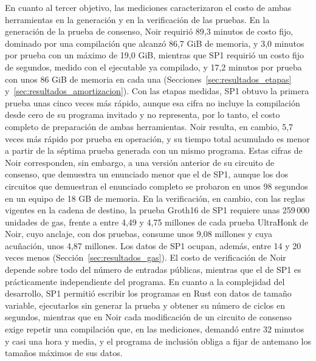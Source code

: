 En cuanto al tercer objetivo, las mediciones caracterizaron el costo de ambas herramientas
en la generación y en la verificación de las pruebas. En la generación de la prueba de consenso,
Noir requirió 89,3 minutos de costo fijo, dominado por una compilación que alcanzó 86,7 GiB de
memoria, y 3,0 minutos por prueba con un máximo de 19,0 GiB, mientras que SP1 requirió un costo
fijo de segundos, medido con el ejecutable ya compilado, y 17,2 minutos por prueba con unos 86 GiB de memoria en cada una
(Secciones~\ref{sec:resultados_etapas} y~\ref{sec:resultados_amortizacion}). Con las etapas
medidas, SP1 obtuvo la primera prueba unas cinco veces más rápido, aunque esa cifra no incluye la
compilación desde cero de su programa invitado y no representa, por lo tanto, el costo completo de
preparación de ambas herramientas. Noir resulta, en cambio, 5,7
veces más rápido por prueba en operación, y su tiempo total acumulado es menor a partir de la
séptima prueba generada con un mismo programa. Estas cifras de Noir corresponden, sin embargo, a una
versión anterior de su circuito de consenso, que demuestra un enunciado menor que el de SP1, aunque
los dos circuitos que demuestran el enunciado completo se probaron en unos 98 segundos en un equipo
de 18 GB de memoria. En la verificación, en cambio, con las reglas vigentes en la cadena de
destino, la prueba Groth16 de SP1 requiere unas 259\,000 unidades de gas, frente a entre 4,49 y
4,75 millones de cada prueba UltraHonk de Noir, cuyo anclaje, con dos pruebas, consume unos
9,08 millones y cuya acuñación, unos 4,87 millones. Los datos de SP1 ocupan, además, entre 14 y
20 veces menos (Sección~\ref{sec:resultados_gas}). El
costo de verificación de Noir depende sobre todo del número de entradas públicas, mientras que el
de SP1 es prácticamente independiente del programa. En cuanto a la complejidad del desarrollo, SP1
permitió escribir los programas en Rust con datos de tamaño variable, ejecutarlos sin generar la
prueba y obtener su número de ciclos en segundos, mientras que en Noir cada modificación de un
circuito de consenso exige repetir una compilación que, en las mediciones, demandó entre 32 minutos
y casi una hora y media, y el programa de inclusión obliga a fijar de antemano los tamaños máximos
de sus datos.

